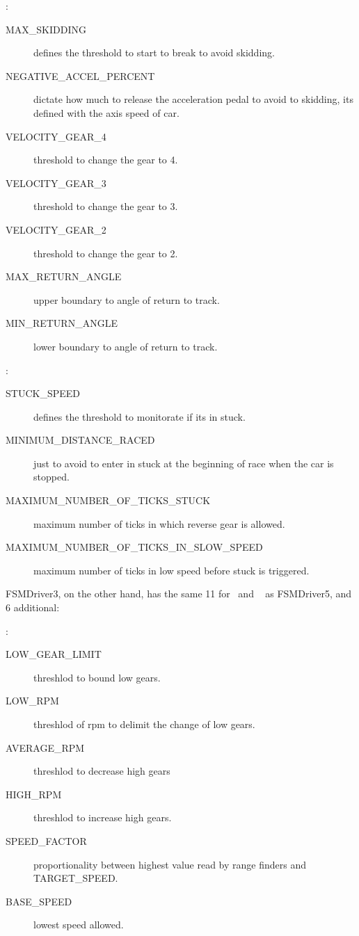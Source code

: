 \OT:%
\begin{description}
	\item[MAX\_SKIDDING] defines the threshold to start to break to avoid skidding.
	\item[NEGATIVE\_ACCEL\_PERCENT] dictate how much to release the acceleration pedal to avoid to skidding, its defined with the axis speed of car.
	\item[VELOCITY\_GEAR\_4] threshold to change the gear to 4.
	\item[VELOCITY\_GEAR\_3] threshold to change the gear to 3.
	\item[VELOCITY\_GEAR\_2] threshold to change the gear to 2.
	\item[MAX\_RETURN\_ANGLE] upper boundary to angle of return to track.
	\item[MIN\_RETURN\_ANGLE] lower boundary to angle of return to track.
\end{description}
\St:%
\begin{description}
	\item[STUCK\_SPEED] defines the threshold to monitorate if its in stuck.
	\item[MINIMUM\_DISTANCE\_RACED] just to avoid to enter in stuck at the beginning of race when the car is stopped.
	\item[MAXIMUM\_NUMBER\_OF\_TICKS\_STUCK] maximum number of ticks in which reverse gear is allowed.
	\item[MAXIMUM\_NUMBER\_OF\_TICKS\_IN\_SLOW\_SPEED] maximum number of ticks in low speed before stuck is triggered.
\end{description}

FSMDriver3, on the other hand, has the same 11 for \OT~and \St~ as FSMDriver5, and 6 additional:

\IT:%
\begin{description}
	\item[LOW\_GEAR\_LIMIT] threshlod to bound low gears.
	\item[LOW\_RPM] threshlod of rpm to delimit the change of low gears.
	\item[AVERAGE\_RPM] threshlod to decrease high gears
	\item[HIGH\_RPM] threshlod to increase high gears.
	\item[SPEED\_FACTOR] proportionality between highest value read by range finders and TARGET\_SPEED.
	\item[BASE\_SPEED] lowest speed allowed.
\end{description}

